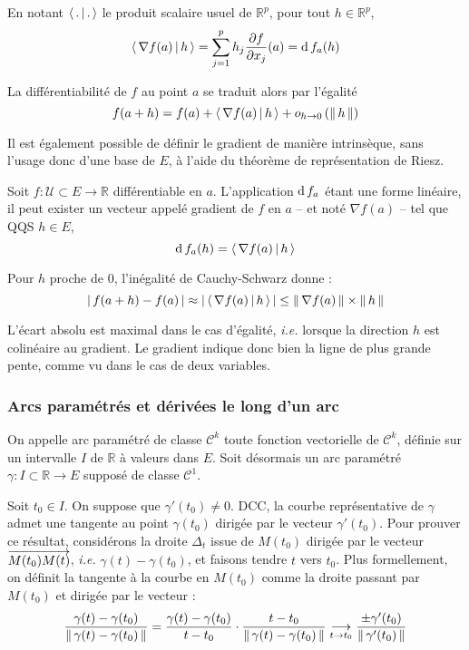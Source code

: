     En notant $\left<\,.\,\middle|\,.\,\right>$ le produit scalaire usuel de $\mathbb{R}^p$, pour tout $h \in \mathbb{R}^p$, 
    \[ \left<\,\nabla f(a)\,\middle|\,h\,\right> = \sum_{j=1}^{p} h_j \frac{\partial f}{\partial x_j}(a) = \operatorname{d} f_a(h) \] 

    La différentiabilité de $f$ au point $a$ se traduit alors par l’égalité 
    \[ f(a+h) = f(a) + \left<\,\nabla f(a)\,\middle|\,h\,\right> + o_{h \rightarrow 0} \left(\left\lVert \,h \, \right\rVert\right) \]   

    Il est également possible de définir le gradient de manière intrinsèque, sans l’usage donc d’une base de $E$, à l’aide du théorème de représentation de Riesz.

    \begin{defi}{}{}
        Soit $f : \mathcal{U} \subset E \to \mathbb{R}$ différentiable en $a$. L’application $\operatorname{d} f_a$ étant une forme linéaire, il peut exister un vecteur appelé gradient de $f$ en $a$ -- et noté $\nabla f(a)$ -- tel que QQS $h \in E$, 
        \[ \operatorname{d} f_a(h) = \left<\,\nabla f (a)\,\middle|\,h\,\right> \]   
    \end{defi}

    Pour $h$ proche de $0$, l’inégalité de Cauchy-Schwarz donne :
    \[ \left\lvert \,f(a+h) - f(a) \, \right\rvert \approx \left\lvert \,\left<\,\nabla f(a)\,\middle|\,h\,\right> \, \right\rvert \leq \left\lVert \,\nabla f(a) \, \right\rVert \times \left\lVert \,h \, \right\rVert \]   
    
    L’écart absolu est maximal dans le cas d’égalité, \textit{i.e.} lorsque la direction $h$ est colinéaire au gradient. Le gradient indique donc bien la ligne de plus grande pente, comme vu dans le cas de deux variables.

    \subsubsection{Arcs paramétrés et dérivées le long d’un arc}

    On appelle arc paramétré de classe $\mathcal{C}^k$ toute fonction vectorielle de $\mathcal{C}^k$, définie sur un intervalle $I$ de $\mathbb{R}$ à valeurs dans $E$. Soit désormais un arc paramétré $\gamma : I \subset \mathbb{R} \to E$ supposé de classe $\mathcal{C}^1$.

    Soit $t_0 \in I$. On suppose que $\gamma'(t_0) \neq 0$. DCC, la courbe représentative de $\gamma$ admet une tangente au point $\gamma(t_0)$ dirigée par le vecteur $\gamma'(t_0)$. Pour prouver ce résultat, considérons la droite $\Delta_t$ issue de $M(t_0)$ dirigée par le vecteur $\overrightarrow{M(t_0)M(t)}$, \textit{i.e.} $\gamma(t) - \gamma(t_0)$, et faisons tendre $t$ vers $t_0$. Plus formellement, on définit la tangente à la courbe en $M(t_0)$ comme la droite passant par $M(t_0)$ et dirigée par le vecteur :
    \[ \frac{\gamma(t) - \gamma(t_0)}{\left\lVert \,\gamma(t) - \gamma(t_0) \, \right\rVert} = \frac{\gamma(t) - \gamma(t_0)}{t - t_0} \cdot \frac{t - t_0}{\left\lVert \,\gamma(t) - \gamma(t_0) \, \right\rVert} \underset{t \rightarrow t_0}{\longrightarrow} \frac{\pm \gamma'(t_0)}{\left\lVert \,\gamma'(t_0) \, \right\rVert} \]  

